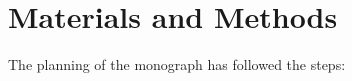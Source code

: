 \documentclass[
12pt,				%
openright,			%
oneside,			%
a4paper,			%
brazil,				%
english,			%
]{abntex2}
\begin{document}





\chapter{Materials and Methods}
The planning of the monograph has followed the steps:
\end{document}
